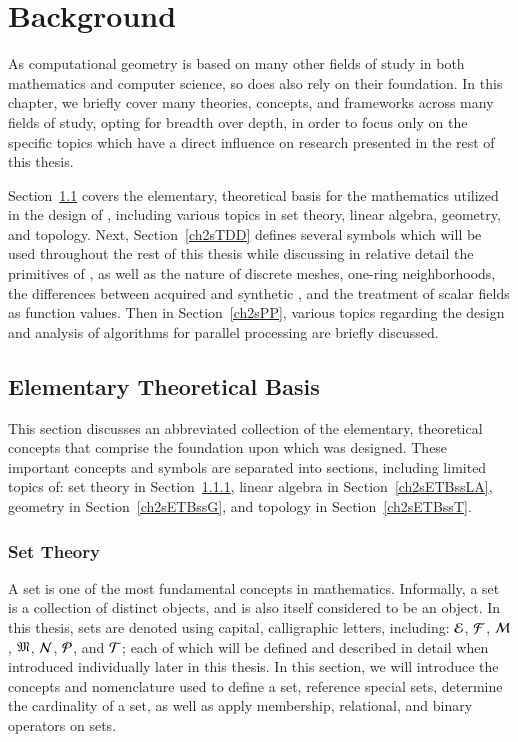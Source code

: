 \chapter{Background}
\label{ch2}
As computational geometry is based on many other fields of study in both mathematics and computer science, so does  also rely on their foundation. In this chapter, we briefly cover many theories, concepts, and frameworks across many fields of study, opting for breadth over depth, in order to focus only on the specific topics which have a direct influence on research presented in the rest of this thesis.

Section~\ref{ch2sETB} covers the elementary, theoretical basis for the mathematics utilized in the design of , including various topics in set theory, linear algebra, geometry, and topology. Next, Section~\ref{ch2sTDD} defines several symbols which will be used throughout the rest of this thesis while discussing in relative detail the primitives of \tdd{}, as well as the nature of discrete meshes, one-ring neighborhoods, the differences between acquired and synthetic \tdd{}, and the treatment of scalar fields as function values. Then in Section~\ref{ch2sPP}, various topics regarding the design and analysis of algorithms for parallel processing are briefly discussed.

%
%
%
%
%
%
\section{Elementary Theoretical Basis}
\label{ch2sETB}
This section discusses an abbreviated collection of the elementary, theoretical concepts that comprise the foundation upon which  was designed. These important concepts and symbols are separated into sections, including limited topics of: set theory in Section~\ref{ch2sETBssST}, linear algebra in Section~\ref{ch2sETBssLA}, geometry in Section~\ref{ch2sETBssG}, and topology in Section~\ref{ch2sETBssT}.

%
%
%
%
\subsection{Set Theory}
\label{ch2sETBssST}
A set is one of the most fundamental concepts in mathematics. Informally, a set is a collection of distinct objects, and is also itself considered to be an object. In this thesis, sets are denoted using capital, calligraphic letters, including: $\mathcal{E}$, $\mathcal{F}$, $\mathcal{M}$, $\mathfrak{M}$, $\mathcal{N}$, $\mathcal{P}$, and $\mathcal{T}$; each of which will be defined and described in detail when introduced individually later in this thesis. In this section, we will introduce the concepts and nomenclature used to define a set, reference special sets, determine the cardinality of a set, as well as apply membership, relational, and binary operators on sets.

